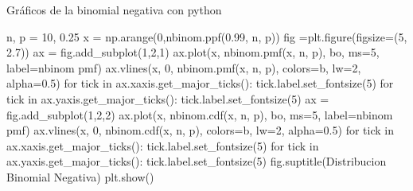 \documentclass[
  ignorenonframetext,
  aspectratio=169]{beamer}
\newenvironment{Shaded}{\begin{snugshade}}{\end{snugshade}}
\newcommand{\ControlFlowTok}[1]{\textcolor[rgb]{0.00,0.23,0.31}{#1}}
\newcommand{\DecValTok}[1]{\textcolor[rgb]{0.68,0.00,0.00}{#1}}
\newcommand{\FloatTok}[1]{\textcolor[rgb]{0.68,0.00,0.00}{#1}}
\newcommand{\KeywordTok}[1]{\textcolor[rgb]{0.00,0.23,0.31}{#1}}
\newcommand{\NormalTok}[1]{\textcolor[rgb]{0.00,0.23,0.31}{#1}}
\newcommand{\OperatorTok}[1]{\textcolor[rgb]{0.37,0.37,0.37}{#1}}
\newcommand{\StringTok}[1]{\textcolor[rgb]{0.13,0.47,0.30}{#1}}
\begin{document}
\begin{frame}[fragile]{Gráficos de la binomial negativa con python}
\protect\hypertarget{gruxe1ficos-de-la-binomial-negativa-con-python-1}{}
\begin{Shaded}
\begin{Highlighting}[]
\NormalTok{n, p }\OperatorTok{=} \DecValTok{10}\NormalTok{, }\FloatTok{0.25}
\NormalTok{x }\OperatorTok{=}\NormalTok{ np.arange(}\DecValTok{0}\NormalTok{,nbinom.ppf(}\FloatTok{0.99}\NormalTok{, n, p))}
\NormalTok{fig }\OperatorTok{=}\NormalTok{plt.figure(figsize}\OperatorTok{=}\NormalTok{(}\DecValTok{5}\NormalTok{, }\FloatTok{2.7}\NormalTok{))}
\NormalTok{ax }\OperatorTok{=}\NormalTok{ fig.add\_subplot(}\DecValTok{1}\NormalTok{,}\DecValTok{2}\NormalTok{,}\DecValTok{1}\NormalTok{)}
\NormalTok{ax.plot(x, nbinom.pmf(x, n, p), }\StringTok{\textquotesingle{}bo\textquotesingle{}}\NormalTok{, ms}\OperatorTok{=}\DecValTok{5}\NormalTok{, label}\OperatorTok{=}\StringTok{\textquotesingle{}nbinom pmf\textquotesingle{}}\NormalTok{)}
\NormalTok{ax.vlines(x, }\DecValTok{0}\NormalTok{, nbinom.pmf(x, n, p), colors}\OperatorTok{=}\StringTok{\textquotesingle{}b\textquotesingle{}}\NormalTok{, lw}\OperatorTok{=}\DecValTok{2}\NormalTok{, alpha}\OperatorTok{=}\FloatTok{0.5}\NormalTok{)}
\ControlFlowTok{for}\NormalTok{ tick }\KeywordTok{in}\NormalTok{ ax.xaxis.get\_major\_ticks():}
\NormalTok{  tick.label.set\_fontsize(}\DecValTok{5}\NormalTok{)}
\ControlFlowTok{for}\NormalTok{ tick }\KeywordTok{in}\NormalTok{ ax.yaxis.get\_major\_ticks():}
\NormalTok{  tick.label.set\_fontsize(}\DecValTok{5}\NormalTok{) }
\NormalTok{ax }\OperatorTok{=}\NormalTok{ fig.add\_subplot(}\DecValTok{1}\NormalTok{,}\DecValTok{2}\NormalTok{,}\DecValTok{2}\NormalTok{)}
\NormalTok{ax.plot(x, nbinom.cdf(x, n, p), }\StringTok{\textquotesingle{}bo\textquotesingle{}}\NormalTok{, ms}\OperatorTok{=}\DecValTok{5}\NormalTok{, label}\OperatorTok{=}\StringTok{\textquotesingle{}nbinom pmf\textquotesingle{}}\NormalTok{)}
\NormalTok{ax.vlines(x, }\DecValTok{0}\NormalTok{, nbinom.cdf(x, n, p), colors}\OperatorTok{=}\StringTok{\textquotesingle{}b\textquotesingle{}}\NormalTok{, lw}\OperatorTok{=}\DecValTok{2}\NormalTok{, alpha}\OperatorTok{=}\FloatTok{0.5}\NormalTok{)}
\ControlFlowTok{for}\NormalTok{ tick }\KeywordTok{in}\NormalTok{ ax.xaxis.get\_major\_ticks():}
\NormalTok{  tick.label.set\_fontsize(}\DecValTok{5}\NormalTok{)}
\ControlFlowTok{for}\NormalTok{ tick }\KeywordTok{in}\NormalTok{ ax.yaxis.get\_major\_ticks():}
\NormalTok{  tick.label.set\_fontsize(}\DecValTok{5}\NormalTok{)}
\NormalTok{fig.suptitle(}\StringTok{\textquotesingle{}Distribucion Binomial Negativa\textquotesingle{}}\NormalTok{)}
\NormalTok{plt.show()}
\end{Highlighting}
\end{Shaded}
\end{frame}
\end{document}
